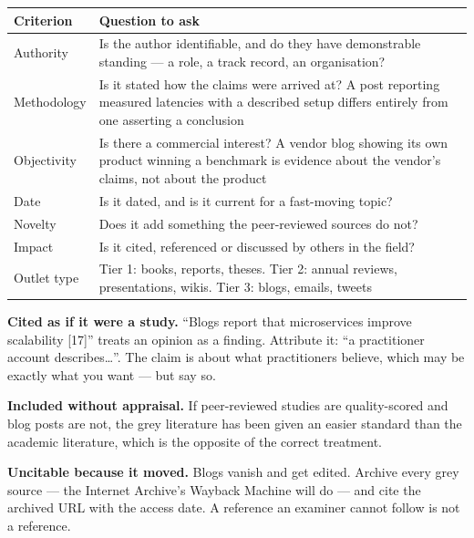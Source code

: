\begin{center}
\small
\begin{tabular}{@{}L{2.7cm}L{11.6cm}@{}}
\toprule
\textbf{Criterion} & \textbf{Question to ask} \\
\midrule
Authority   & Is the author identifiable, and do they have demonstrable
              standing --- a role, a track record, an organisation? \\
Methodology & Is it stated how the claims were arrived at? A post reporting
              measured latencies with a described setup differs entirely from
              one asserting a conclusion \\
Objectivity & Is there a commercial interest? A vendor blog showing its own
              product winning a benchmark is evidence about the vendor's
              claims, not about the product \\
Date        & Is it dated, and is it current for a fast-moving topic? \\
Novelty     & Does it add something the peer-reviewed sources do not? \\
Impact      & Is it cited, referenced or discussed by others in the field? \\
Outlet type & Tier 1: books, reports, theses. Tier 2: annual reviews,
              presentations, wikis. Tier 3: blogs, emails, tweets \\
\bottomrule
\end{tabular}
\end{center}

\begin{pitfall}
\textbf{Cited as if it were a study.} ``Blogs report that microservices improve
scalability [17]'' treats an opinion as a finding. Attribute it: ``a
practitioner account describes\ldots''. The claim is about what practitioners
believe, which may be exactly what you want --- but say so.

\medskip
\textbf{Included without appraisal.} If peer-reviewed studies are quality-scored
and blog posts are not, the grey literature has been given an easier standard
than the academic literature, which is the opposite of the correct treatment.

\medskip
\textbf{Uncitable because it moved.} Blogs vanish and get edited. Archive every
grey source --- the Internet Archive's Wayback Machine will do --- and cite the
archived URL with the access date. A reference an examiner cannot follow is not
a reference.
\end{pitfall}

